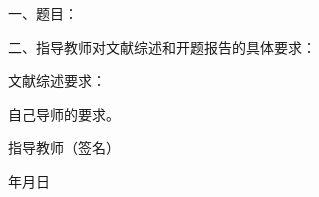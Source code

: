 {\sect 一、题目：}\titleown

{\sect 二、指导教师对文献综述和开题报告的具体要求： }

文献综述要求：

自己导师的要求。


\vspace*{0.1\paperheight}

{\bfseries {
\hspace*{0.4\paperwidth} 指导教师（签名）

\hspace*{0.55\paperwidth} 年\hspace*{1em}月\hspace*{1em}日}}